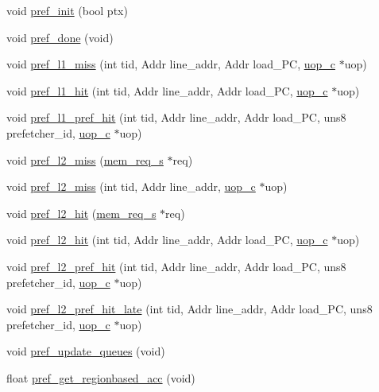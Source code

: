 \begin{DoxyCompactItemize}
\item 
void \hyperlink{classhwp__common__c_a37a047d6ec507e7196af2ec0d56f2f1c}{pref\_\-init} (bool ptx)
\item 
void \hyperlink{classhwp__common__c_ae36402703dbe7309b0c67c383aede723}{pref\_\-done} (void)
\item 
void \hyperlink{classhwp__common__c_aa85c61c7a62418fb25a23036abff4bbf}{pref\_\-l1\_\-miss} (int tid, Addr line\_\-addr, Addr load\_\-PC, \hyperlink{classuop__c}{uop\_\-c} $\ast$uop)
\item 
void \hyperlink{classhwp__common__c_ad74dc778458b548c715c9da8b5e0ca1b}{pref\_\-l1\_\-hit} (int tid, Addr line\_\-addr, Addr load\_\-PC, \hyperlink{classuop__c}{uop\_\-c} $\ast$uop)
\item 
void \hyperlink{classhwp__common__c_a4b53b2fc3c651fd8bba14bc63ff93770}{pref\_\-l1\_\-pref\_\-hit} (int tid, Addr line\_\-addr, Addr load\_\-PC, uns8 prefetcher\_\-id, \hyperlink{classuop__c}{uop\_\-c} $\ast$uop)
\item 
void \hyperlink{classhwp__common__c_a6dd7ab394a5eb5916addef4051d0fc50}{pref\_\-l2\_\-miss} (\hyperlink{structmem__req__s}{mem\_\-req\_\-s} $\ast$req)
\item 
void \hyperlink{classhwp__common__c_a9f1ebbc980fc34a90ca941e4303f3149}{pref\_\-l2\_\-miss} (int tid, Addr line\_\-addr, \hyperlink{classuop__c}{uop\_\-c} $\ast$uop)
\item 
void \hyperlink{classhwp__common__c_af321b93d2f9915e2de6edeff08e7258a}{pref\_\-l2\_\-hit} (\hyperlink{structmem__req__s}{mem\_\-req\_\-s} $\ast$req)
\item 
void \hyperlink{classhwp__common__c_a5ef508bec06b03508dffba1805c1ec5d}{pref\_\-l2\_\-hit} (int tid, Addr line\_\-addr, Addr load\_\-PC, \hyperlink{classuop__c}{uop\_\-c} $\ast$uop)
\item 
void \hyperlink{classhwp__common__c_aa1a2849ec0b7ab08625ec4a7bf2d235a}{pref\_\-l2\_\-pref\_\-hit} (int tid, Addr line\_\-addr, Addr load\_\-PC, uns8 prefetcher\_\-id, \hyperlink{classuop__c}{uop\_\-c} $\ast$uop)
\item 
void \hyperlink{classhwp__common__c_a8ac359d52de4f5288fdae0d6ab960284}{pref\_\-l2\_\-pref\_\-hit\_\-late} (int tid, Addr line\_\-addr, Addr load\_\-PC, uns8 prefetcher\_\-id, \hyperlink{classuop__c}{uop\_\-c} $\ast$uop)
\item 
void \hyperlink{classhwp__common__c_a5f78b740698b02cb175594f9c1112f73}{pref\_\-update\_\-queues} (void)
\item 
float \hyperlink{classhwp__common__c_a0016b8b26679fbe491b67b0f016296d2}{pref\_\-get\_\-regionbased\_\-acc} (void)

\end{DoxyCompactItemize}
